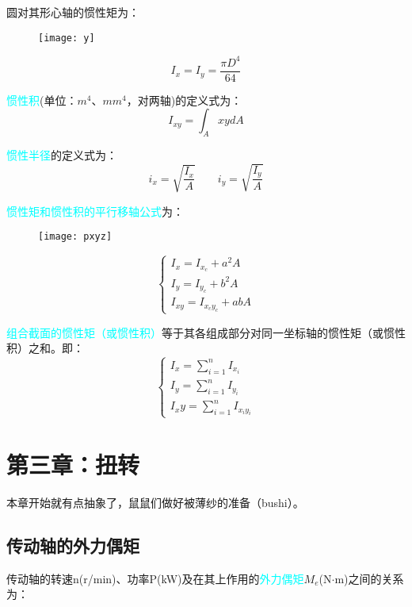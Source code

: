\documentclass[10pt,a4paper]{ctexart}
\begin{document}
圆对其形心轴的惯性矩为：
\begin{figure}[htp]%
	\centering
	\texttt{[image: y]}
\end{figure}
\begin{equation}
	I_x=I_y=\frac{\pi D^4}{64}
	\label{yg}
\end{equation}

\textcolor{cyan}{惯性积}(单位：$m^4$、$mm^4$，对两轴)的定义式为：
\begin{equation}
I_{xy}=\int_A xydA
\end{equation}

\textcolor{cyan}{惯性半径}的定义式为：
\begin{equation}
i_x=\sqrt{\frac{I_x}{A}} \qquad i_y=\sqrt{\frac{I_y}{A}}
\end{equation}

\textcolor{cyan}{惯性矩和惯性积的平行移轴公式}为：
\begin{figure}[htp]%
	\centering
	\texttt{[image: pxyz]}
\end{figure}

\begin{equation}
	\begin{cases}
		I_x=I_{x_c}+a^2A\\
		I_y=I_{y_c}+b^2A\\
		I_{xy}=I_{x_cy_c}+abA
	\end{cases}
\end{equation}

\textcolor{cyan}{组合截面的惯性矩（或惯性积）}等于其各组成部分对同一坐标轴的惯性矩（或惯性积）之和。即：
\begin{equation}
	\begin{cases}
		I_x=\sum\limits_{i=1}^n I_{x_i}\\
		I_y=\sum\limits_{i=1}^n I_{y_i}\\
		I_xy=\sum\limits_{i=1}^n I_{x_iy_i}
	\end{cases}
\end{equation}
\newpage
\section{第三章：扭转}
本章开始就有点抽象了，鼠鼠们做好被薄纱的准备（bushi）。

\subsection{传动轴的外力偶矩}
传动轴的转速n(r/min)、功率P(kW)及在其上作用的\textcolor{cyan}{外力偶矩}$M_e$(N$\cdot$m)之间的关系为：
\end{document}

